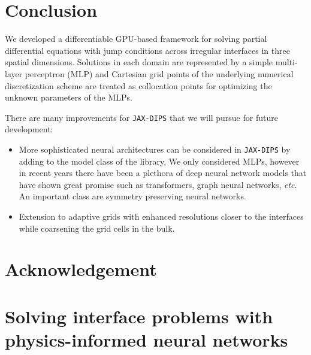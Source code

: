 \documentclass{elsarticle}
\begin{document}
\section{Conclusion} \label{sec:conc}
We developed a differentiable GPU-based framework for solving partial differential equations with jump conditions across irregular interfaces in three spatial dimensions. Solutions in each domain are represented by a simple multi-layer perceptron (MLP) and Cartesian grid points of the underlying numerical discretization scheme are treated as collocation points for optimizing the unknown parameters of the MLPs. 


There are many improvements for \texttt{JAX-DIPS} that we will pursue for future development:

\begin{itemize}

\item  More sophisticated neural architectures can be considered in \texttt{JAX-DIPS} by adding to the model class of the library. We only considered MLPs, however in recent years there have been a plethora of deep neural network models that have shown great promise such as transformers, graph neural networks, \textit{etc}. An important class are symmetry preserving neural networks.

\item Extension to adaptive grids with enhanced resolutions closer to the interfaces while coarsening the grid cells in the bulk.


\end{itemize}

\section*{Acknowledgement}



\newpage





\appendix
\section{Solving interface problems with physics-informed neural networks}
\end{document}
